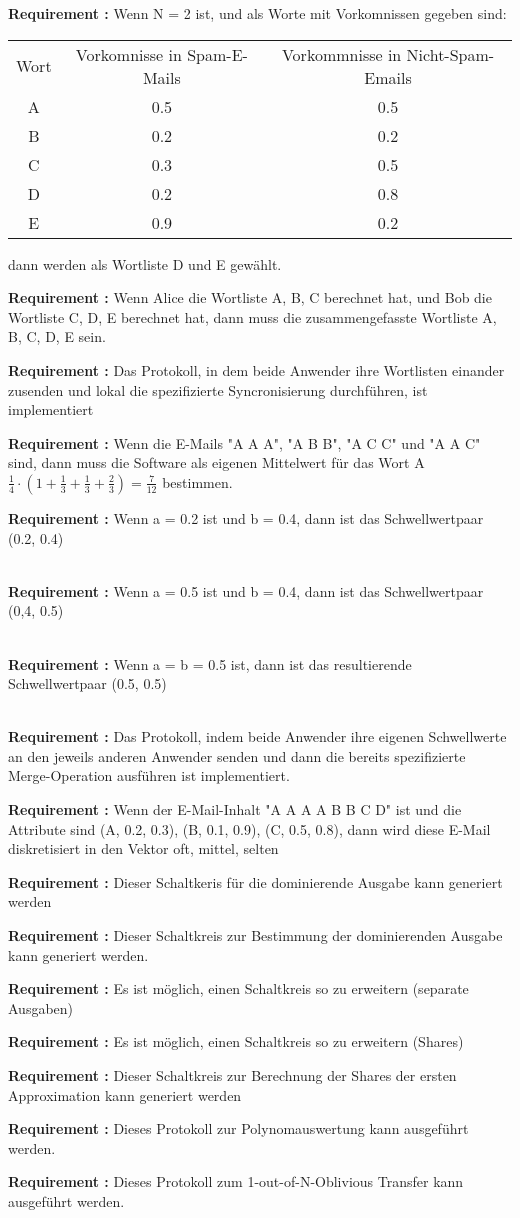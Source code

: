 \documentclass{article}
\newcounter{requirementscount}{}
\newcommand{\requirement}[1] {
        \addtocounter{requirementscount}{1}
        {\bf Requirement \therequirementscount:} #1\\
    }
\begin{document}
\requirement{Wenn N = 2 ist, und als Worte mit Vorkomnissen gegeben sind:
\begin{center}
\begin{tabular}{c c c}
Wort & Vorkomnisse in Spam-E-Mails & Vorkommnisse in Nicht-Spam-Emails \\
A & 0.5 & 0.5 \\
B & 0.2 & 0.2 \\
C & 0.3 & 0.5 \\
D & 0.2 & 0.8 \\
E & 0.9 & 0.2
\end{tabular}
\end{center}
dann werden als Wortliste D und E gew\"ahlt.}
\requirement{Wenn Alice die Wortliste A, B, C berechnet hat, und Bob die
Wortliste C, D, E berechnet hat, dann muss die zusammengefasste Wortliste
A, B, C, D, E sein.} 

\requirement{Das Protokoll, in dem beide Anwender ihre Wortlisten einander
zusenden und lokal die spezifizierte Syncronisierung durchf\"uhren, ist
implementiert}
\requirement{Wenn die E-Mails "A A A", "A B B", "A C C" und "A A C" sind, dann
muss die Software als eigenen Mittelwert f\"ur das Wort A 
\(\frac{1}{4} \cdot (1 + \frac{1}{3} + \frac{1}{3} + \frac{2}{3}) = \frac{7}{12}\) bestimmen.}
\requirement{Wenn a = 0.2 ist und b = 0.4, dann ist das Schwellwertpaar
(0.2, 0.4)}\\
\requirement{Wenn a = 0.5 ist und b = 0.4, dann ist das Schwellwertpaar
(0,4, 0.5)}\\
\requirement{Wenn a = b = 0.5 ist, dann ist das resultierende Schwellwertpaar
(0.5, 0.5)}\\
\requirement{Das Protokoll, indem beide Anwender ihre eigenen Schwellwerte
an den jeweils anderen Anwender senden und dann die bereits spezifizierte
Merge-Operation ausf\"uhren ist implementiert.}
\requirement{Wenn der E-Mail-Inhalt "A A A A B B C D" ist und die Attribute
sind (A, 0.2, 0.3), (B, 0.1, 0.9), (C, 0.5, 0.8),
dann wird diese E-Mail diskretisiert in den Vektor oft, mittel, selten}
\requirement{Dieser Schaltkeris f\"ur die dominierende Ausgabe 
kann generiert werden}
\requirement{Dieser Schaltkreis zur Bestimmung der dominierenden Ausgabe kann
generiert werden.}
\requirement{Es ist m\"oglich, einen Schaltkreis so zu erweitern (separate Ausgaben)}

\requirement{Es ist m\"oglich, einen Schaltkreis so zu erweitern (Shares)}
\requirement{Dieser Schaltkreis zur Berechnung der Shares der
ersten Approximation kann generiert werden}
\requirement{Dieses Protokoll zur Polynomauswertung kann ausgef\"uhrt werden.}
\requirement{Dieses Protokoll zum 1-out-of-N-Oblivious Transfer kann
ausgef\"uhrt werden.}
\end{document}
